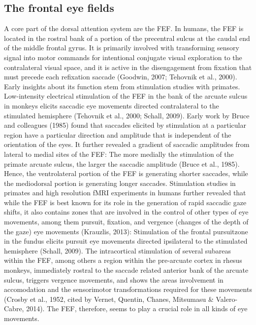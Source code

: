 \documentclass[a4paper, 11pt]{scrreprt}
\begin{document}
\subsection{The frontal eye fields}
A core part of the dorsal attention system are the FEF. In humans, the FEF is located in the rostral bank of a portion of the precentral sulcus at the caudal end of the middle frontal gyrus. It is primarily involved with transforming sensory signal into motor commands for intentional conjugate visual exploration to the contralateral visual space, and it is active in the disengagement from fixation that must precede each refixation saccade (Goodwin, 2007; Tehovnik et al., 2000). Early insights about its function stem from stimulation studies with primates. Low-intensity electrical stimulation of the FEF in the bank of the arcuate sulcus in monkeys elicits saccadic eye movements directed contralateral to the stimulated hemisphere (Tehovnik et al., 2000; Schall, 2009). Early work by Bruce and colleagues (1985) found that saccades elicited by stimulation at a particular region have a particular direction and amplitude that is independent of the orientation of the eyes. It further revealed a gradient of saccadic amplitudes from lateral to medial sites of the FEF: The more medially the stimulation of the primate arcuate sulcus, the larger the saccadic amplitude (Bruce et al., 1985). Hence, the ventrolateral portion of the FEF is generating shorter saccades, while the mediodorsal portion is generating longer saccades. Stimulation studies in primates and high resolution fMRI experiments in humans further revealed that while the FEF is best known for its role in the generation of rapid saccadic gaze shifts, it also contains zones that are involved in the  control of other types of eye movements, among them pursuit, fixation, and vergence (changes of the depth of the gaze) eye movements (Krauzlis, 2013): Stimulation of the frontal pursuitzone in the fundus elicits pursuit eye movements directed ipsilateral to the stimulated hemisphere (Schall, 2009). The intracortical stimulation of several subareas within the FEF, among others a region within the pre-arcuate cortex in rhesus monkeys, immediately rostral to the saccade related anterior bank of the arcuate sulcus, triggers vergence movements, and shows the areas involvement in accomodation and the sensorimotor transformations required for these movements (Crosby et al., 1952, cited by Vernet, Quentin, Chanes, Mitsumasu \& Valero-Cabre, 2014). The FEF, therefore, seems to play a crucial role in all kinds of eye movements. \newline
\end{document}
